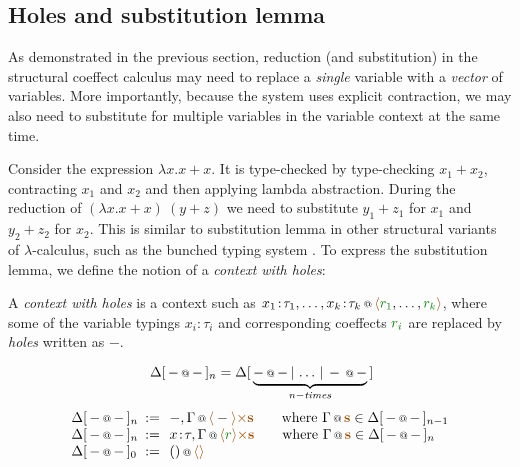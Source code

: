 \subsection{Holes and substitution lemma}

As demonstrated in the previous section, reduction (and substitution) in the structural coeffect 
calculus may need to replace a \emph{single} variable with a \emph{vector} of variables. 
More importantly, because the system uses explicit contraction, we may also need to substitute 
for multiple variables in the variable context at the same time.

Consider the expression $\lambda x.x+x$. It is type-checked by type-checking $x_1 + x_2$,
contracting $x_1$ and $x_2$ and then applying lambda abstraction. During the reduction of 
$(\lambda x.x+x)~(y+z)$ we need to substitute $y_1+z_1$ for $x_1$ and $y_2+z_2$ for $x_2$.
This is similar to substitution lemma in other structural variants of $\lambda$-calculus,
such as the bunched typing system \cite{substruct-bunched}. To express the substitution 
lemma, we define the notion of a \emph{context with holes}:

\begin{definition}
A \emph{context with holes} is a context such as $\coctx{x_1\!:\!\tau_1, \ldots, x_k\!:\!\tau_k}{\alift{\cclrd{r_1}, \ldots, \cclrd{r_k}}}$,
where some of the variable typings $x_i\!:\!\tau_i$ and corresponding coeffects $\cclrd{r_i}$ 
are replaced by \emph{holes} written as $-$.

\begin{equation*}
~\Delta[\,\coctx{-}{-}\,]_n = \Delta[\,\underbrace{\coctx{-}{-} \,|\, \ldots \,|\, \coctx{-}{-}}_{ n-\textit{times} } \,]
\end{equation*}
\begin{equation*}
\begin{array}{lcl}
 \Delta[\,\coctx{-}{-}\,]_n &\narrow{:=}&
   \coctx{-, \Gamma}{\alift{-} \atimes \aclrd{\textbf{s}} }
   \qquad \textnormal{where}~\coctx{\Gamma}{\aclrd{\textbf{s}}} \in \Delta[\,\coctx{-}{-}\,]_{n-1} \\
 \Delta[\,\coctx{-}{-}\,]_n &\narrow{:=}&
   \coctx{x\!:\!\tau, \Gamma}{\alift{\cclrd{r}} \atimes \aclrd{\textbf{s}} }
   \qquad \textnormal{where}~\coctx{\Gamma}{\aclrd{\textbf{s}}} \in \Delta[\,\coctx{-}{-}\,]_n \\
 \Delta[\,\coctx{-}{-}\,]_0 &\narrow{:=}&
   \coctx{()}{\alift{}}
\end{array} 
\end{equation*} 
\end{definition}

